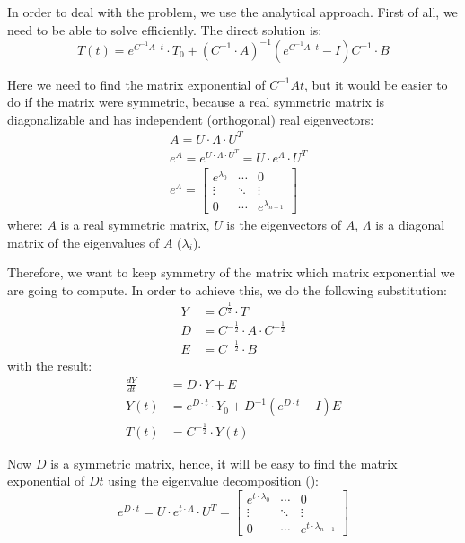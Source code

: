 In order to deal with the problem, we use the analytical approach. First of all, we need to be able to solve  efficiently. The direct solution is:
\begin{equation} \label{eq:solution}
  T(t) = e^{C^{-1}A \cdot t} \cdot T_0 + (C^{-1} \cdot A)^{-1}(e^{C^{-1}A \cdot t} - I)C^{-1} \cdot B
\end{equation}

Here we need to find the matrix exponential of $C^{-1} At$, but it would be easier to do if the matrix were symmetric, because a real symmetric matrix is diagonalizable and has independent (orthogonal) real eigenvectors:
\begin{align}
  & A = U \cdot \Lambda \cdot U^T \label{eq:eigenvalue-decomposition} \\
  & e^A = e^{U \cdot \Lambda \cdot U^T} = U \cdot e^{\Lambda} \cdot U^T \nonumber \\
  & e^{\Lambda} = \left[
      \begin{array}{ccc}
        e^{\lambda_0} & \cdots & 0 \\
        \vdots & \ddots & \vdots \\
        0 & \cdots & e^{\lambda_{n - 1}}
      \end{array}
    \right] \nonumber
\end{align}
where: $A$ is a real symmetric matrix, $U$ is the eigenvectors of $A$, $\Lambda$ is a diagonal matrix of the eigenvalues of $A$ ($\lambda_i$).

Therefore, we want to keep symmetry of the matrix which matrix exponential we are going to compute. In order to achieve this, we do the following substitution:
\begin{align*}
  Y & = C^{\frac{1}{2}} \cdot T \\
  D & = C^{-\frac{1}{2}} \cdot A \cdot C^{-\frac{1}{2}} \\
  E & = C^{-\frac{1}{2}} \cdot B
\end{align*}
with the result:
\begin{align}
  \frac{dY}{dt} & = D \cdot Y + E \nonumber \\
  Y(t) & = e^{D \cdot t} \cdot Y_{0} + D^{-1}(e^{D \cdot t} - I)E \label{eq:modified-solution} \\
  T(t) & = C^{-\frac{1}{2}} \cdot Y(t) \nonumber
\end{align}

Now $D$ is a symmetric matrix, hence, it will be easy to find the matrix exponential of $D t$ using the eigenvalue decomposition ():
\[
  e^{D \cdot t} = U \cdot e^{t \cdot \Lambda} \cdot U^T = \left[
      \begin{array}{ccc}
        e^{t \cdot \lambda_0} & \cdots & 0 \\
        \vdots & \ddots & \vdots \\
        0 & \cdots & e^{t \cdot \lambda_{n - 1}}
      \end{array}
    \right]
\]

